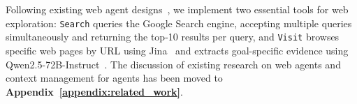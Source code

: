 Following existing web agent designs~\citep{li2025websailor, gao2025asearcher, li2025chainofagent}, we implement two essential tools for web exploration: \texttt{Search} queries the Google Search engine, accepting multiple queries simultaneously and returning the top-10 results per query, and \texttt{Visit} browses specific web pages by URL using Jina~\citep{jina} and extracts goal-specific evidence using Qwen2.5-72B-Instruct~\citep{qwen2.5}. The discussion of existing research on web agents and context management for agents has been moved to \textbf{Appendix~\ref{appendix:related_work}}.
